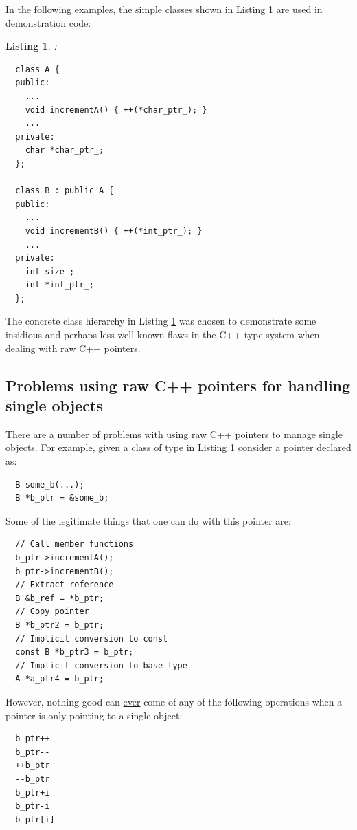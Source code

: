 \documentclass[pdf,ps2pdf,11pt]{SANDreport}
\newtheorem{listing}{Listing}
\begin{document}
In the following examples, the simple classes shown in Listing
{}\ref{listing:Simple_A_B} are used in demonstration code:

\begin{listing}:\\
\label{listing:Simple_A_B}
{\small\begin{verbatim}
  class A {
  public:
    ...
    void incrementA() { ++(*char_ptr_); }
    ...
  private:
    char *char_ptr_;
  };

  class B : public A {
  public:
    ...
    void incrementB() { ++(*int_ptr_); }
    ...
  private:
    int size_;
    int *int_ptr_;
  };
\end{verbatim}}
\end{listing}

The concrete class hierarchy in Listing {}\ref{listing:Simple_A_B} was
chosen to demonstrate some insidious and perhaps less well known flaws
in the C++ type system when dealing with raw C++ pointers.


%
{}\subsection{Problems using raw C++ pointers for handling single objects}
%

There are a number of problems with using raw C++ pointers to manage
single objects.  For example, given a class of type {} in
Listing {}\ref{listing:Simple_A_B} consider a pointer declared as:

{\small\begin{verbatim}
  B some_b(...);
  B *b_ptr = &some_b;
\end{verbatim}}

Some of the legitimate things that one can do with this pointer are:

{\small\begin{verbatim}
  // Call member functions
  b_ptr->incrementA();
  b_ptr->incrementB();
  // Extract reference
  B &b_ref = *b_ptr;
  // Copy pointer
  B *b_ptr2 = b_ptr;
  // Implicit conversion to const
  const B *b_ptr3 = b_ptr;
  // Implicit conversion to base type
  A *a_ptr4 = b_ptr;
\end{verbatim}}

However, nothing good can {}\underline{ever} come of any of the
following operations when a pointer is only pointing to a single
object:

{\small\begin{verbatim}
  b_ptr++
  b_ptr--
  ++b_ptr
  --b_ptr
  b_ptr+i
  b_ptr-i
  b_ptr[i]
\end{verbatim}}
\end{document}
